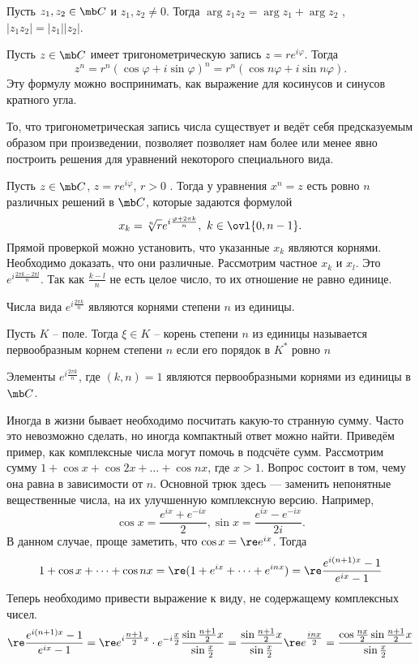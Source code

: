 \crl Пусть $z_1, z_2\in \mb C$  и $z_1,z_2\neq 0$. Тогда $\arg z_1z_2 = \arg z_1 + \arg z_2$ , $|z_1z_2| = |z_1 ||z_2 |$.
\ecrl

 Пусть $z\in \mb C$ имеет тригонометрическую запись $z=re^{i\varphi}$. Тогда
$$z^{n}=r^{n}(\cos \varphi +i\sin \varphi )^{n}=r^{n}(\cos n\varphi +i\sin n\varphi ).$$
Эту формулу можно воспринимать, как выражение для косинусов и синусов кратного угла.
\ecrl

То, что тригонометрическая запись числа существует и ведёт себя предсказуемым образом при произведении, позволяет позволяет нам более или менее явно построить решения для уравнений некоторого специального вида.

 Пусть $z\in \mb C$, $z=re^{i\varphi}$, $r>0$ . Тогда у уравнения $x^n=z$ есть ровно $n$ различных
решений в $\mb C$, которые задаются формулой
$$ x_k =\sqrt[n]{r} e^{i\frac{\varphi + 2\pi k}{n}} ,\,\, k\in \ovl{0,n-1}.$$
\ethrm
\proof
Прямой проверкой можно установить, что указанные $x_k$ являются корнями. Необходимо доказать, что они различные. Рассмотрим частное $x_k$ и $x_l$. Это $e^{i\frac{ 2\pi k- 2\pi l}{n}}$. Так как $\frac{k-l}{n}$ не есть целое число, то их отношение не равно единице.
\endproof

\rm Числа вида $e^{i\frac{2\pi k}{n}}$ являются корнями степени $n$ из единицы.
\erm

\dfn Пусть $K$ -- поле. Тогда $\xi\in K$ -- корень степени $n$ из единицы  называется первообразным корнем степени $n$ если его порядок в $ K^*$ ровно $n$
\edfn

\rm Элементы $e^{i\frac{2\pi k}{n}}$, где $(k,n)=1$ являются первообразными корнями из единицы в $\mb C$.
\erm



Иногда в жизни бывает необходимо посчитать какую-то странную сумму. Часто это невозможно сделать, но иногда компактный ответ можно найти. Приведём пример, как комплексные числа могут помочь в подсчёте сумм.
Рассмотрим сумму $1+ \cos x + \cos 2x + \dots + \cos nx$, где $x > 1$. Вопрос состоит в том, чему она равна в зависимости от $n$. Основной трюк здесь --- заменить непонятные вещественные числа, на их улучшенную комплексную версию. Например, $$\cos x = \frac{e^{ix}+e^{-ix}}{2}, \sin x = \frac{e^{ix}-e^{-ix}}{2i}.$$
В данном случае, проще заметить, что $\cos x=\re e^{ix}$. Тогда
$$1 + \cos x+ \dots + \cos nx = \re(1+ e^{ix} + \dots + e^{inx}) = \re \frac{e^{i(n+1)x}-1}{e^{ix}-1}$$
Теперь необходимо привести выражение к виду, не содержащему комплексных чисел.
$$\re \frac{e^{i(n+1)x}-1}{e^{ix}-1} = \re e^{i\tfrac{n+1}{2}x}\cdot e^{-i\tfrac{x}{2}}\frac{\sin \tfrac{n+1}{2}x}{\sin\tfrac{x}{2}}=\frac{ \sin \tfrac{n+1}{2}x}{\sin\tfrac{x}{2}} \re e^{\tfrac{inx}{2}}=
\frac{\cos \tfrac{nx}{2} \sin \tfrac{n+1}{2}x}{\sin\tfrac{x}{2}}$$

